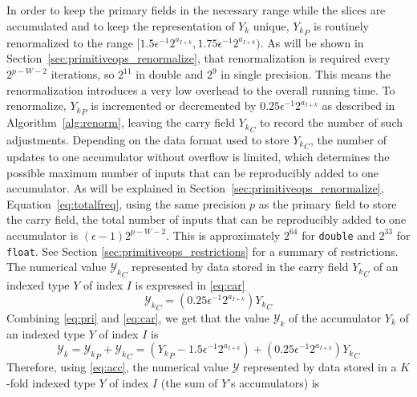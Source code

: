       In order to keep the primary fields in the necessary range while the
      slices are accumulated and to keep the representation of $Y_k$ unique,
      ${Y_k}_P$ is routinely renormalized to the range 
      \(
        [1.5 \epsilon^{-1} 2^{a_{I + k}}, 1.75 \epsilon^{-1} 2^{a_{I + k}}).
      \)
      As will be shown in Section~\ref{sec:primitiveops_renormalize},
      that renormalization is required every $2^{p-W-2}$ iterations,
      so $2^{11}$ in double and $2^9$ in single precision.
      This means the renormalization introduces a very low overhead
      to the overall running time.
      To renormalize, ${Y_k}_P$ is incremented or decremented by
      $0.25 \epsilon^{-1} 2^{a_{I + k}}$ as described in Algorithm~\ref{alg:renorm},
      leaving the carry field ${Y_k}_C$ to record the number of such adjustments.
      Depending on the data format used to store ${Y_k}_C$, the number of
      updates to one accumulator without overflow is limited,
      which determines the possible maximum number of inputs that can be
      reproducibly added to one accumulator.
      As will be explained in Section~\ref{sec:primitiveops_renormalize},
      Equation~\eqref{eq:totalfreq}, using the same precision $p$ as the primary field
      to store the carry field, the total number of inputs
      that can be reproducibly added to one accumulator is 
      $(\epsilon - 1)2^{p-W-2}$. This is approximately $2^{64}$ for 
      \texttt{double} and $2^{33}$ for \texttt{float}. See Section 
      \ref{sec:primitiveops_restrictions} for a summary of restrictions.
      The numerical value ${\mathcal{Y}_k}_C$ represented by data stored in the carry field
      ${Y_k}_C$ of an indexed type $Y$ of index $I$ is expressed in
      \eqref{eq:car}
      \begin{equation}
        {\mathcal{Y}_k}_C = (0.25\epsilon^{-1}2^{a_{I + k}}){Y_k}_C
        \label{eq:car}
      \end{equation}
      Combining \eqref{eq:pri} and \eqref{eq:car}, we get that the value $\mathcal{Y}_k$ of the accumulator $Y_k$ of an indexed type $Y$ of index $I$ is
      \begin{equation}
        \mathcal{Y}_k = {\mathcal{Y}_k}_P + {\mathcal{Y}_k}_C = ({Y_k}_P - 1.5 \epsilon^{-1}2^{a_{I + k}}) + (0.25\epsilon^{-1}2^{a_{I + k}}){Y_k}_C
        \label{eq:acc}
      \end{equation}
      Therefore, using  \eqref{eq:acc}, the numerical value $\mathcal{Y}$ represented by data stored in a $K$-fold indexed type $Y$ of index $I$ (the sum of $Y$'s accumulators) is
